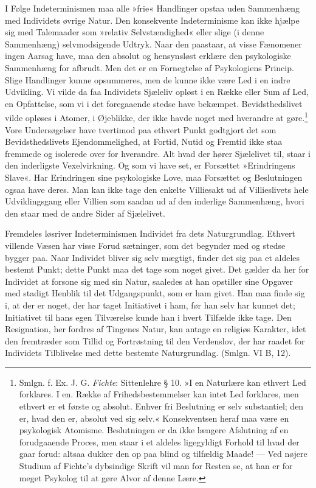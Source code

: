 \documentclass[12pt,a4paper,openany]{book}
\newcommand{\opage}[1]{\marginnote{\footnotesize\textit{[#1]}}}
\begin{document}
I Følge Indeterminismen maa alle »frie« Handlinger opstaa uden
Sammenhæng med Individets øvrige Natur. Den konsekvente Indeterminisme
kan ikke hjælpe sig med Talemaader som »relativ Selvstændighed« eller
slige (i denne Sammenhæng) selvmodsigende Udtryk. Naar den paastaar, at
visse Fænomener ingen Aarsag have, maa den absolut og hensynsløst
erklære den psykologiske Sammenhæng for afbrudt. Men det er en
Fornegtelse af Psykologiens Princip. Slige Handlinger kunne opsummeres,
men de kunne ikke være Led i en indre Udvikling. Vi vilde da faa
Individets Sjæleliv opløst i en Række eller Sum af Led, en Opfattelse,
som vi i det foregaaende stedse have bekæmpet. Bevidsthedslivet vilde
opløses i Atomer, i Øjeblikke, der ikke havde noget med hverandre at
gøre.\footnote[1]{Smlgn. f. Ex. J. G. \emph{Fichte}: Sittenlehre § 10.
»I en Naturlære kan ethvert Led forklares. I en. Række af
Frihedsbestemmelser kan intet Led forklares, men ethvert er et første og
absolut. Enhver fri Beslutning er selv substantiel; den er, hvad den er,
absolut ved sig selv.« Konsekventsen heraf maa være en psykologisk
Atomisme. Beslutningen er da ikke længere Afslutning af en forudgaaende
Proces, men staar i et aldeles ligegyldigt Forhold til hvad der gaar
forud: altsaa dukker den op paa blind og tilfældig Maade! --- Ved nøjere
Studium af Fichte’s dybsindige Skrift vil man for Resten se, at han er
for meget Psykolog til at gøre Alvor af denne Lære.} Vore Undersøgelser
have tvertimod paa ethvert Punkt godtgjort det som Bevidsthedslivets
Ejendommelighed, at Fortid, Nutid og Fremtid ikke staa fremmede og
isolerede over for hverandre. Alt hvad der hører Sjælelivet til, staar i
den inderligste Vexelvirkning. Og som vi have set, er Forsættet
»Erindringens Slave«. Har Erindringen sine psykologiske Love, maa
Forsættet og Beslutningen ogsaa have deres. Man kan ikke tage den
enkelte Villiesakt ud af Villieslivets hele Udviklingsgang eller Villien
som saadan ud af den inderlige Sammenhæng, hvori den staar med de andre
Sider af Sjælelivet.

Fremdeles løsriver Indeterminismen Individet fra dets Naturgrundlag.
Ethvert villende Væsen har visse Forud%
\opage{403}sætninger, som det begynder med og stedse bygger paa. Naar
Individet bliver sig selv mægtigt, finder det sig paa et aldeles bestemt
Punkt; dette Punkt maa det tage som noget givet. Det gælder da her for
Individet at forsone sig med sin Natur, saaledes at han opstiller sine
Opgaver med stadigt Henblik til det Udgangspunkt, som er ham givet. Han
maa finde sig i, at der er noget, der har taget Initiativet i ham, før
han selv har kunnet det; Initiativet til hans egen Tilværelse kunde han
i hvert Tilfælde ikke tage. Den Resignation, her fordres af Tingenes
Natur, kan antage en religiøs Karakter, idet den fremtræder som Tillid
og Fortrøstning til den Verdenslov, der har raadet for Individets
Tilblivelse med dette bestemte Naturgrundlag. (Smlgn. VI B, 12).
\end{document}
